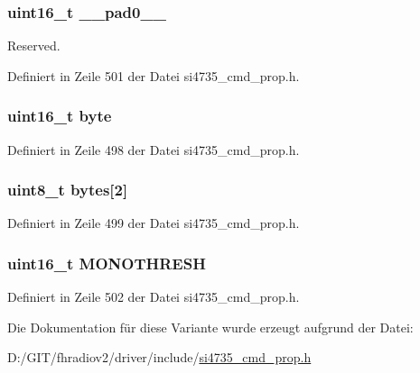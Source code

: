 \subsubsection[{\+\_\+\+\_\+pad0\+\_\+\+\_\+}]{\setlength{\rightskip}{0pt plus 5cm}uint16\+\_\+t \+\_\+\+\_\+pad0\+\_\+\+\_\+}\label{unionfm__blend__mono_a77132c2c26a75f5b8751b235cda23828}


Reserved. 



Definiert in Zeile 501 der Datei si4735\+\_\+cmd\+\_\+prop.\+h.

\hypertarget{unionfm__blend__mono_ab0549c1b5ea980a02e7eab77e21fea49}{}
\subsubsection[{byte}]{\setlength{\rightskip}{0pt plus 5cm}uint16\+\_\+t byte}\label{unionfm__blend__mono_ab0549c1b5ea980a02e7eab77e21fea49}


Definiert in Zeile 498 der Datei si4735\+\_\+cmd\+\_\+prop.\+h.

\hypertarget{unionfm__blend__mono_a46e4c05d20a047ec169f60d3167e912e}{}
\subsubsection[{bytes}]{\setlength{\rightskip}{0pt plus 5cm}uint8\+\_\+t bytes\mbox{[}2\mbox{]}}\label{unionfm__blend__mono_a46e4c05d20a047ec169f60d3167e912e}


Definiert in Zeile 499 der Datei si4735\+\_\+cmd\+\_\+prop.\+h.

\hypertarget{unionfm__blend__mono_a5de7498b6512934529d0c6284f120805}{}
\subsubsection[{M\+O\+N\+O\+T\+H\+R\+E\+S\+H}]{\setlength{\rightskip}{0pt plus 5cm}uint16\+\_\+t M\+O\+N\+O\+T\+H\+R\+E\+S\+H}\label{unionfm__blend__mono_a5de7498b6512934529d0c6284f120805}


Definiert in Zeile 502 der Datei si4735\+\_\+cmd\+\_\+prop.\+h.



Die Dokumentation für diese Variante wurde erzeugt aufgrund der Datei\+:\begin{DoxyCompactItemize}
\item 
D\+:/\+G\+I\+T/fhradiov2/driver/include/\hyperlink{si4735__cmd__prop_8h}{si4735\+\_\+cmd\+\_\+prop.\+h}\end{DoxyCompactItemize}

